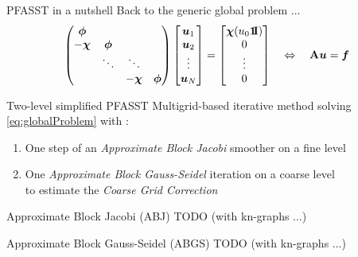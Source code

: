 \documentclass[11pt,aspectratio=43]{beamer}
\newcommand{\ones}{\mbox{1\hspace{-0.2em}I}}
\newcommand{\matr}[1]{\mathbf{#1}}
\newcommand{\vect}[1]{\boldsymbol{#1}}
\newcommand{\uvect}{\vect{u}}
\begin{document}
\begin{frame}{PFASST in a nutshell}
   	Back to the generic global problem ...
    \begin{equation}\label{eq:globalProblem}
    	\begin{pmatrix}
        \bm{\phi} & & &\\
        -\bm{\chi} & \bm{\phi} & &\\
        & \ddots & \ddots &\\
        & & -\bm{\chi} & \bm{\phi}
    \end{pmatrix}
    \begin{bmatrix}
        \uvect_1\\\uvect_2\\\vdots\\\uvect_N
    \end{bmatrix}
    =
    \begin{bmatrix}
        \bm{\chi}(u_0\vect{\ones})\\0\\\vdots\\0
    \end{bmatrix}
    \quad \Leftrightarrow \quad
    \matr{A}\uvect = \vect{f}
    \end{equation}
    
    \begin{block}{Two-level simplified PFASST}
    Multigrid-based iterative method solving \eqref{eq:globalProblem} with :
    \begin{enumerate}
    	\item One step of an \textit{Approximate Block Jacobi} smoother on a fine level
    	\item One \textit{Approximate Block Gauss-Seidel} iteration on a coarse level \\
    	to estimate the \textit{Coarse Grid Correction}
    \end{enumerate}
    \end{block}
\end{frame}

\begin{frame}{Approximate Block Jacobi (ABJ)}
    TODO (with kn-graphs ...)
\end{frame}

\begin{frame}{Approximate Block Gauss-Seidel (ABGS)}
	TODO (with kn-graphs ...)
\end{frame}
\end{document}
